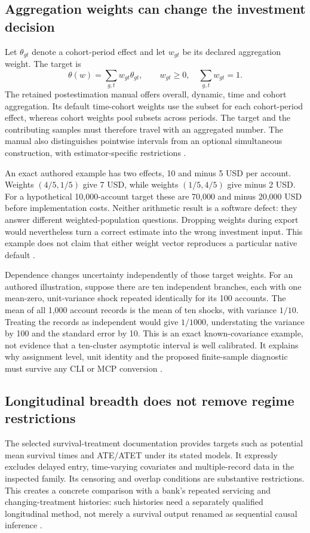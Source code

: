 \subsection{Aggregation weights can change the investment decision}
Let $\theta_{gt}$ denote a cohort-period effect and let $w_{gt}$ be its
declared aggregation weight. The target is
\[
 \theta(w)=\sum_{g,t} w_{gt}\theta_{gt},\qquad
 w_{gt}\geq0,\quad\sum_{g,t}w_{gt}=1.
\]
The retained postestimation manual offers overall, dynamic, time and cohort
aggregation. Its default time-cohort weights use the subset for each
cohort-period effect, whereas cohort weights pool subsets across periods.
The target and the contributing samples must therefore travel with an
aggregated number. The manual also distinguishes pointwise intervals from
an optional simultaneous construction, with estimator-specific restrictions
\cite{exec18_gp_stata_post}.

An exact authored example has two effects, 10 and minus 5 USD per account.
Weights $(4/5,1/5)$ give 7 USD, while weights $(1/5,4/5)$ give minus
2 USD. For a hypothetical 10,000-account target these are 70,000 and minus
20,000 USD before implementation costs. Neither arithmetic result is a
software defect: they answer different weighted-population questions.
Dropping weights during export would nevertheless turn a correct estimate
into the wrong investment input. This example does not claim that either
weight vector reproduces a particular native default
\cite{exec24_stata_choice}.

Dependence changes uncertainty independently of those target weights.
For an authored illustration, suppose there are ten independent branches,
each with one mean-zero, unit-variance shock repeated identically for its
100 accounts. The mean of all 1,000 account records is the mean of ten
shocks, with variance $1/10$. Treating the records as independent would
give $1/1000$, understating the variance by 100 and the standard error by
10. This is an exact known-covariance example, not evidence that a
ten-cluster asymptotic interval is well calibrated. It explains why
assignment level, unit identity and the proposed finite-sample diagnostic
must survive any CLI or MCP conversion \cite{exec24_stata_choice}.

\subsection{Longitudinal breadth does not remove regime restrictions}
The selected survival-treatment documentation provides targets such as
potential mean survival times and ATE/ATET under its stated models. It
expressly excludes delayed entry, time-varying covariates and multiple-record
data in the inspected family. Its censoring and overlap conditions are
substantive restrictions. This creates a concrete comparison with a bank's
repeated servicing and changing-treatment histories: such histories need
a separately qualified longitudinal method, not merely a survival output
renamed as sequential causal inference
\cite{exec14_survival_stata,exec24_stata_choice}.

